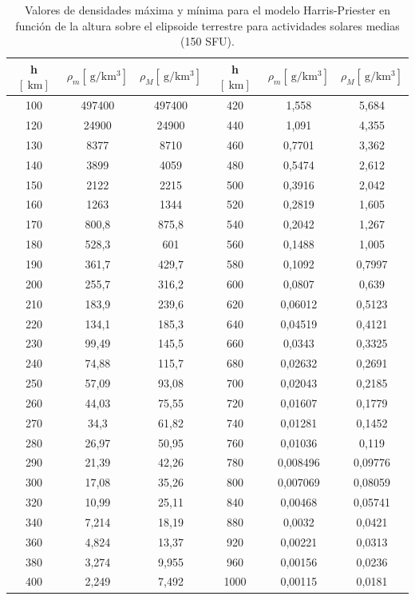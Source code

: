 \begin{table}[!htb]
	\centering
	\caption{Valores de densidades máxima y mínima para el modelo Harris-Priester en función de la altura sobre el elipsoide terrestre para actividades solares medias (150 SFU).}
	\begin{tabular}{ccc|ccc}
		\toprule
		\multicolumn{1}{c}{h $\left[\SI{}{\kilo\metre}\right]$} & \multicolumn{1}{c}{$\rho_m \left[\SI{}{\gram / \kilo\metre\cubed}\right]$} & \multicolumn{1}{c|}{$\rho_M \left[\SI{}{\gram / \kilo\metre\cubed}\right]$} & \multicolumn{1}{c}{h $\left[\SI{}{\kilo\metre}\right]$} & \multicolumn{1}{c}{$\rho_m \left[\SI{}{\gram / \kilo\metre\cubed}\right]$} & \multicolumn{1}{c}{$\rho_M \left[\SI{}{\gram / \kilo\metre\cubed}\right]$} \\
		\midrule
		100   & 497400 & 497400 & 420   & 1,558 & 5,684 \\
		120   & 24900 & 24900 & 440   & 1,091 & 4,355 \\
		130   & 8377  & 8710  & 460   & 0,7701 & 3,362 \\
		140   & 3899  & 4059  & 480   & 0,5474 & 2,612 \\
		150   & 2122  & 2215  & 500   & 0,3916 & 2,042 \\
		160   & 1263  & 1344  & 520   & 0,2819 & 1,605 \\
		170   & 800,8 & 875,8 & 540   & 0,2042 & 1,267 \\
		180   & 528,3 & 601   & 560   & 0,1488 & 1,005 \\
		190   & 361,7 & 429,7 & 580   & 0,1092 & 0,7997 \\
		200   & 255,7 & 316,2 & 600   & 0,0807 & 0,639 \\
		210   & 183,9 & 239,6 & 620   & 0,06012 & 0,5123 \\
		220   & 134,1 & 185,3 & 640   & 0,04519 & 0,4121 \\
		230   & 99,49 & 145,5 & 660   & 0,0343 & 0,3325 \\
		240   & 74,88 & 115,7 & 680   & 0,02632 & 0,2691 \\
		250   & 57,09 & 93,08 & 700   & 0,02043 & 0,2185 \\
		260   & 44,03 & 75,55 & 720   & 0,01607 & 0,1779 \\
		270   & 34,3  & 61,82 & 740   & 0,01281 & 0,1452 \\
		280   & 26,97 & 50,95 & 760   & 0,01036 & 0,119 \\
		290   & 21,39 & 42,26 & 780   & 0,008496 & 0,09776 \\
		300   & 17,08 & 35,26 & 800   & 0,007069 & 0,08059 \\
		320   & 10,99 & 25,11 & 840   & 0,00468 & 0,05741 \\
		340   & 7,214 & 18,19 & 880   & 0,0032 & 0,0421 \\
		360   & 4,824 & 13,37 & 920   & 0,00221 & 0,0313 \\
		380   & 3,274 & 9,955 & 960   & 0,00156 & 0,0236 \\
		400   & 2,249 & 7,492 & 1000  & 0,00115 & 0,0181 \\
		\bottomrule
	\end{tabular}%
\label{table_harris_priester}
\end{table}%
